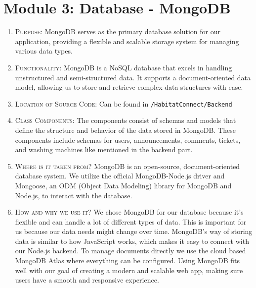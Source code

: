 \documentclass[conference]{IEEEtran}
\begin{document}
\section*{Module 3: Database - MongoDB}
\begin{enumerate}
    \item \textsc{Purpose:} MongoDB serves as the primary database solution for our application, providing a flexible and scalable storage system for managing various data types.

    \item \textsc{Functionality:} MongoDB is a NoSQL database that excels in handling unstructured and semi-structured data. It supports a document-oriented data model, allowing us to store and retrieve complex data structures with ease.

    \item \textsc{Location of Source Code:} Can be found in \texttt{/HabitatConnect/Backend}

    \item \textsc{Class Components:} The components consist of schemas and models that define the structure and behavior of the data stored in MongoDB. These components include schemas for users, announcements, comments, tickets, and washing machines like mentioned in the backend part.

    \item \textsc{Where is it taken from?} MongoDB is an open-source, document-oriented database system. We utilize the official MongoDB-Node.js driver and Mongoose, an ODM (Object Data Modeling) library for MongoDB and Node.js, to interact with the database.

    \item \textsc{How and why we use it?} We chose MongoDB for our database because it's flexible and can handle a lot of different types of data. This is important for us because our data needs might change over time. MongoDB's way of storing data is similar to how JavaScript works, which makes it easy to connect with our Node.js backend. To manage documents directly we use the cloud based MongoDB Atlas where everything can be configured. Using MongoDB fits well with our goal of creating a modern and scalable web app, making sure users have a smooth and responsive experience.
\end{enumerate}


\end{document}
